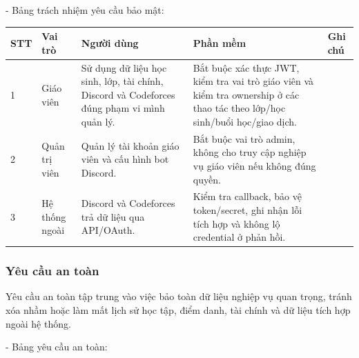 \documentclass[12pt,a4paper]{article}
\begin{document}
\noindent - Bảng trách nhiệm yêu cầu bảo mật:

\begin{table}[!htbp]
\centering
\scriptsize
\setlength{\tabcolsep}{2pt}
\renewcommand{\arraystretch}{1.2}
\begin{tabularx}{\textwidth}{|C{0.8cm}|L{2.4cm}|L{3.5cm}|Y|L{1.5cm}|}
\hline
\textbf{STT} & \textbf{Vai trò} & \textbf{Người dùng} & \textbf{Phần mềm} & \textbf{Ghi chú} \\
 & Giáo viên & Sử dụng dữ liệu học sinh, lớp, tài chính, Discord và Codeforces đúng phạm vi mình quản lý. & Bắt buộc xác thực JWT, kiểm tra vai trò giáo viên và kiểm tra ownership ở các thao tác theo lớp/học sinh/buổi học/giao dịch. & \\
 & Quản trị viên & Quản lý tài khoản giáo viên và cấu hình bot Discord. & Bắt buộc vai trò admin, không cho truy cập nghiệp vụ giáo viên nếu không đúng quyền. & \\
 & Hệ thống ngoài & Discord và Codeforces trả dữ liệu qua API/\allowbreak OAuth. & Kiểm tra callback, bảo vệ token/secret, ghi nhận lỗi tích hợp và không lộ credential ở phản hồi. & \\
\hline
\end{tabularx}
\end{table}

\subsubsection{Yêu cầu an toàn}

Yêu cầu an toàn tập trung vào việc bảo toàn dữ liệu nghiệp vụ quan trọng, tránh
xóa nhầm hoặc làm mất lịch sử học tập, điểm danh, tài chính và dữ liệu tích hợp
ngoài hệ thống.

\noindent - Bảng yêu cầu an toàn:
\end{document}
